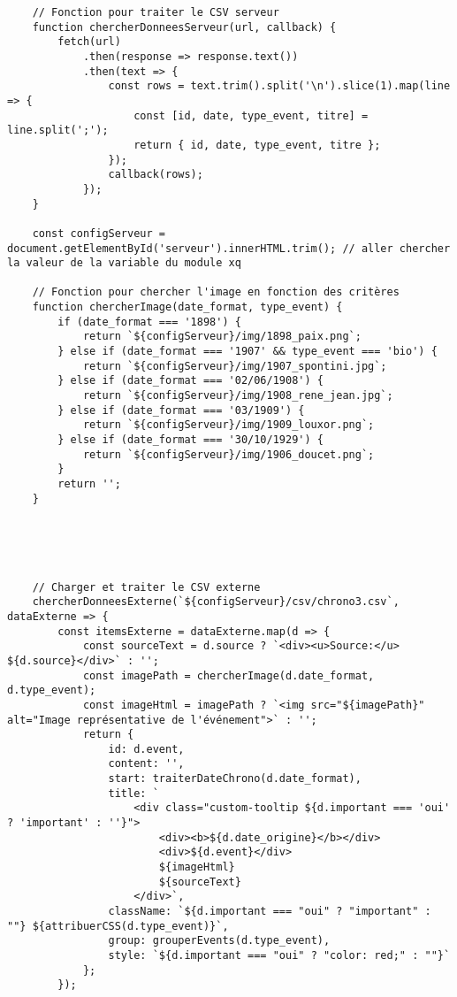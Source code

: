 \begin{verbatim}
    // Fonction pour traiter le CSV serveur
    function chercherDonneesServeur(url, callback) {
        fetch(url)
            .then(response => response.text())
            .then(text => {
                const rows = text.trim().split('\n').slice(1).map(line => {
                    const [id, date, type_event, titre] = line.split(';');
                    return { id, date, type_event, titre };
                });
                callback(rows);
            });
    }

    const configServeur = document.getElementById('serveur').innerHTML.trim(); // aller chercher la valeur de la variable du module xq 
    
    // Fonction pour chercher l'image en fonction des critères
    function chercherImage(date_format, type_event) {
        if (date_format === '1898') {
            return `${configServeur}/img/1898_paix.png`;
        } else if (date_format === '1907' && type_event === 'bio') {
            return `${configServeur}/img/1907_spontini.jpg`;
        } else if (date_format === '02/06/1908') {
            return `${configServeur}/img/1908_rene_jean.jpg`;
        } else if (date_format === '03/1909') {
            return `${configServeur}/img/1909_louxor.png`; 
        } else if (date_format === '30/10/1929') {
            return `${configServeur}/img/1906_doucet.png`;
        }
        return '';
    }

   
   
   
   
    // Charger et traiter le CSV externe
    chercherDonneesExterne(`${configServeur}/csv/chrono3.csv`, dataExterne => {
        const itemsExterne = dataExterne.map(d => {
            const sourceText = d.source ? `<div><u>Source:</u> ${d.source}</div>` : '';
            const imagePath = chercherImage(d.date_format, d.type_event);
            const imageHtml = imagePath ? `<img src="${imagePath}" alt="Image représentative de l'événement">` : '';
            return {
                id: d.event,
                content: '',
                start: traiterDateChrono(d.date_format),
                title: `
                    <div class="custom-tooltip ${d.important === 'oui' ? 'important' : ''}">
                        <div><b>${d.date_origine}</b></div>
                        <div>${d.event}</div>
                        ${imageHtml}
                        ${sourceText}
                    </div>`,
                className: `${d.important === "oui" ? "important" : ""} ${attribuerCSS(d.type_event)}`,
                group: grouperEvents(d.type_event),
                style: `${d.important === "oui" ? "color: red;" : ""}`
            };
        });


\end{verbatim}
